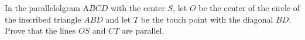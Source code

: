 In the parallelolgram A$BCD$ with the center $S$, let $O$ be the center of the circle of the inscribed triangle $ABD$ and let $T$  be the touch point with the diagonal $BD$. Prove that the lines $OS$ and $CT$ are parallel.